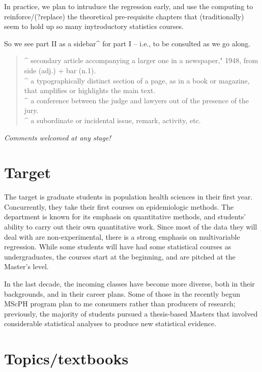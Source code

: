 \documentclass[]{book}
\begin{document}
In practice, we plan to intruduce the regression early, and use the computing to reinforce/(?replace) the theoretical pre-requisite chapters that (traditionally) seem to hold up so many inytroductory statistics courses.

So we see part II as a sidebar\^{} for part I -- i.e., to be consulted as we go along.

\begin{quote}
\^{} secondary article accompanying a larger one in a newspaper," 1948, from side (adj.) + bar (n.1).\\
\^{} a typographically distinct section of a page, as in a book or magazine, that amplifies or highlights the main text.\\
\^{} a conference between the judge and lawyers out of the presence of the jury.\\
\^{} a subordinate or incidental issue, remark, activity, etc.
\end{quote}

\emph{Comments welcomed at any stage!}

\hypertarget{target}{%
\section{Target}\label{target}}

The target is graduate students in population health sciences in their first year. Concurrently, they take their first courses on epidemiologic methods. The department is known for its emphasis on quantitative methods, and students' ability to carry out their own quantitative work. Since most of the data they will deal with are non-experimental, there is a strong emphasis on multivariable regression. While some students will have had some statistical courses as undergraduates, the courses start at the beginning, and are pitched at the Master's level.

In the last decade, the incoming classes have become more diverse, both in their backgrounds, and in their career plans. Some of those in the recently begun MScPH program plan to me consumers rather than producers of research; previously, the majority of students pursued a thesis-based Masters that involved considerable statistical analyses to produce new statistical evidence.

\hypertarget{topicstextbooks}{%
\section{Topics/textbooks}\label{topicstextbooks}}
\end{document}
